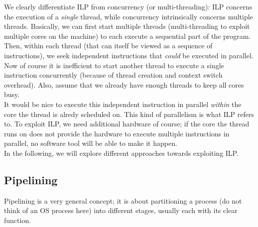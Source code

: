 \documentclass[main.tex]{subfiles}
\begin{document}
We clearly differentiate ILP from concurrency (or multi-threading): ILP concerns the execution of a \textit{single} thread, while concurrency intrinsically concerns multiple threads. Basically, we can first start multiple threads (multi-threading to exploit multiple cores on the machine) to each execute a sequential part of the program. Then, within each thread (that can itself be viewed as a sequence of instructions), we seek independent instructions that \textit{could} be executed in parallel. Now of course it is inefficient to start another thread to execute a single instruction concurrently (because of thread creation and context switch overhead). Also, assume that we already have enough threads to keep all cores busy.\\
It would be nice to execute this independent instruction in parallel \textit{within} the core the thread is alredy scheduled on. This kind of parallelism is what ILP refers to. To exploit ILP, we need additional hardware of course; if the core the thread runs on does not provide the hardware to execute multiple instructions in parallel, no software tool will be able to make it happen.\\
In the following, we will explore different approaches towards exploiting ILP.

\subsection{Pipelining}
Pipelining is a very general concept; it is about partitioning a process (do not think of an OS process here) into different stages, usually each with its clear function.
\end{document}
